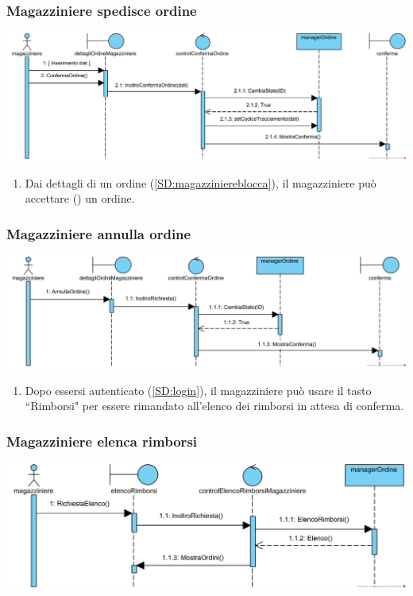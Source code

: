 \documentclass[12pt]{article}
\begin{document}
\subsubsection{Magazziniere spedisce ordine}
\label{SD:magazzinierespedisce}
\begin{center}
\includegraphics[width=\textwidth]{SequenceDiagram/MagazziniereOrdineSpedisce}
\end{center}

\begin{enumerate}
\item Dai dettagli di un ordine (\ref{SD:magazziniereblocca}), il magazziniere può accettare (\checkmark) un ordine.
\end{enumerate}

\subsubsection{Magazziniere annulla ordine}
\label{SD:magazziniereannulla}
\begin{center}
\includegraphics[width=\textwidth]{SequenceDiagram/MagazziniereOrdineAnnulla}
\end{center}

\begin{enumerate}
\item Dopo essersi autenticato (\ref{SD:login}), il magazziniere può usare il tasto ``Rimborsi" per essere rimandato all'elenco dei rimborsi in attesa di conferma.
\end{enumerate}

\subsubsection{Magazziniere elenca rimborsi}
\label{SD:magazziniereelencorimborsi}
\begin{center}
\includegraphics[width=\textwidth]{SequenceDiagram/MagazziniereRimborsoElenco}
\end{center}
\end{document}

